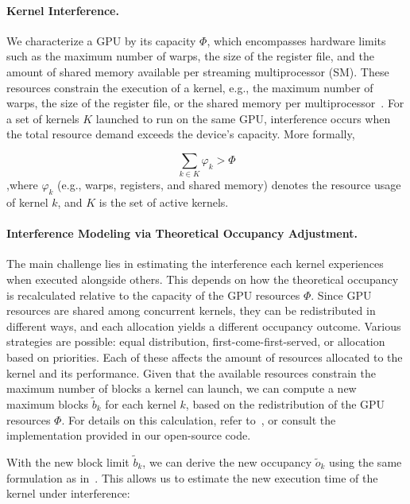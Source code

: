 \paragraph{Kernel Interference.} We characterize a GPU by its capacity $\Phi$, which encompasses hardware limits such as the maximum number of warps, the size of the register file, and the amount of shared memory available per streaming multiprocessor (SM). These resources constrain the execution of a kernel, e.g., the maximum number of warps, the size of the register file, or the shared memory per multiprocessor~\cite{lim2017autotuninggpukernelsstatic}. For a set of kernels $K$ launched to run on the same GPU, interference occurs when the total resource demand exceeds the device's capacity. More formally,

\begin{equation}\label{eq:occurrence}
	\sum_{k \in K} \varphi_k > \Phi
\end{equation}
,where $\varphi_k$ (e.g., warps, registers, and shared memory) denotes the resource usage of kernel $k$, and $K$ is the set of active kernels.

\paragraph{Interference Modeling via Theoretical Occupancy Adjustment.} The main challenge lies in estimating the interference each kernel experiences when executed alongside others. This depends on how the theoretical occupancy is recalculated relative to the capacity of the GPU resources $\Phi$. Since GPU resources are shared among concurrent kernels, they can be redistributed in different ways, and each allocation yields a different occupancy outcome. Various strategies are possible: equal distribution, first-come-first-served, or allocation based on priorities. Each of these affects the amount of resources allocated to the kernel and its performance. Given that the available resources constrain the maximum number of blocks a kernel can launch, we can compute a new maximum blocks $\tilde{b}_k$ for each kernel $k$, based on the redistribution of the GPU resources $\Phi$. For details on this calculation, refer to~\cite{lim2017autotuninggpukernelsstatic}, or consult the implementation provided in our open-source code.

With the new block limit $\tilde{b}_k$, we can derive the new occupancy $\tilde{o}_k$ using the same formulation as in~. This allows us to estimate the new execution time of the kernel under interference:

